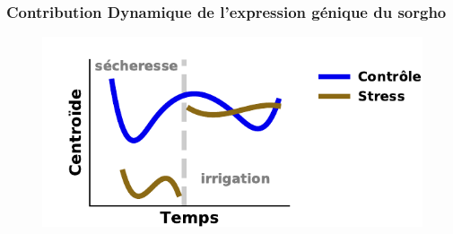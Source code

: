 \documentclass[11pt,xcolor=dvipsnames]{beamer}
\begin{document}
\begin{frame}
\frametitle{Contribution \quad Dynamique de l'expression génique du sorgho}
\begin{figure}
\includegraphics[width=0.6\linewidth]{figures/amf_centroids.pdf}
\end{figure}

\vspace{1.5em}
\begin{overlayarea}{12cm}{5cm}
\end{overlayarea}
\end{frame}
\end{document}
